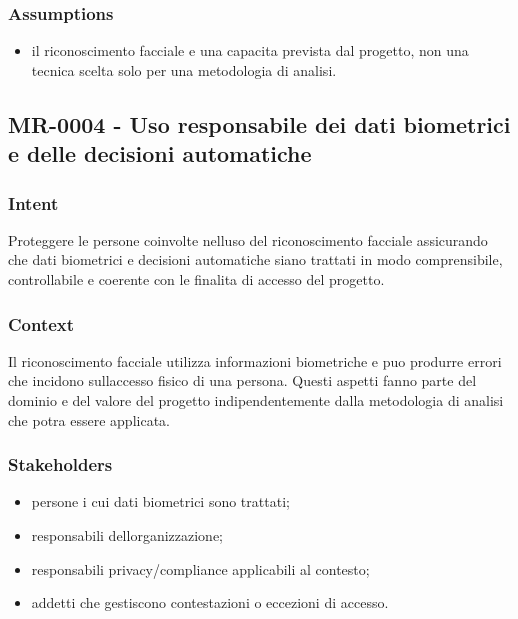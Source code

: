 \documentclass[
  10pt,
]{article}
\providecommand{\tightlist}{%
  \setlength{\itemsep}{0pt}\setlength{\parskip}{0pt}}
\begin{document}
\subsubsection{Assumptions}\label{assumptions}

\begin{itemize}
\tightlist
\item
  il riconoscimento facciale e una capacita prevista dal progetto, non
  una tecnica scelta solo per una metodologia di analisi.
\end{itemize}

\subsection{MR-0004 - Uso responsabile dei dati biometrici e delle
decisioni
automatiche}\label{mr-0004---uso-responsabile-dei-dati-biometrici-e-delle-decisioni-automatiche}

\subsubsection{Intent}\label{intent-3}

Proteggere le persone coinvolte nell\textquotesingle uso del
riconoscimento facciale assicurando che dati biometrici e decisioni
automatiche siano trattati in modo comprensibile, controllabile e
coerente con le finalita di accesso del progetto.

\subsubsection{Context}\label{context-3}

Il riconoscimento facciale utilizza informazioni biometriche e puo
produrre errori che incidono sull\textquotesingle accesso fisico di una
persona. Questi aspetti fanno parte del dominio e del valore del
progetto indipendentemente dalla metodologia di analisi che potra essere
applicata.

\subsubsection{Stakeholders}\label{stakeholders-3}

\begin{itemize}
\tightlist
\item
  persone i cui dati biometrici sono trattati;
\item
  responsabili dell\textquotesingle organizzazione;
\item
  responsabili privacy/compliance applicabili al contesto;
\item
  addetti che gestiscono contestazioni o eccezioni di accesso.
\end{itemize}
\end{document}
